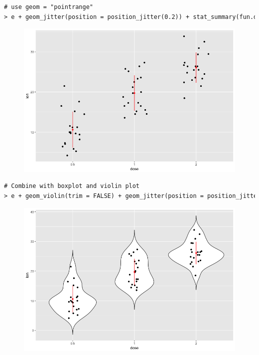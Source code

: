 \begin{lstlisting}[language=html]
# use geom = "pointrange"
> e + geom_jitter(position = position_jitter(0.2)) + stat_summary(fun.data = "mean_sdl", fun.args = list(mult = 1), shape = 18, color = "red")
\end{lstlisting}
\begin{figure}[H]\begin{center}\includegraphics[scale=1 ]{ilu/bg113.png}\end{center}\end{figure}
\begin{lstlisting}[language=html]
# Combine with boxplot and violin plot
> e + geom_violin(trim = FALSE) + geom_jitter(position = position_jitter(0.1)) + stat_summary(fun.data = "mean_sdl", fun.args = list(mult = 1), shape = 18, color = "red")
\end{lstlisting}
\begin{figure}[H]\begin{center}\includegraphics[scale=1 ]{ilu/bg114.png}\end{center}\end{figure}
